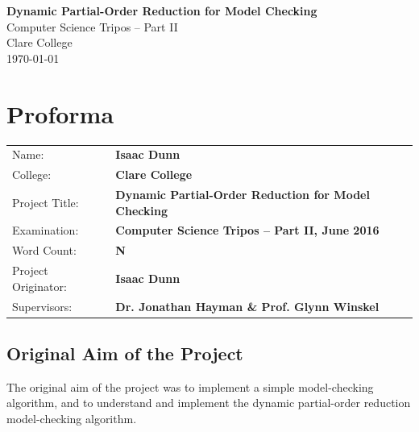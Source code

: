 \documentclass[12pt,a4paper,twoside,openright]{report}
\begin{document}





\pagestyle{empty}


\vspace*{60mm}
\begin{center}
\Huge
\textbf{Dynamic Partial-Order Reduction for Model Checking} \\[7mm]
Computer Science Tripos -- Part II \\[6mm]
Clare College \\[7mm]
\LARGE \today  %
\end{center}


\pagestyle{plain}

\chapter*{Proforma}

{\large
\begin{tabular}{ll}
Name:           & \bf Isaac Dunn                            			 \\
College:        & \bf Clare College                    				     \\
Project Title:	& \bf Dynamic Partial-Order Reduction for Model Checking \\
Examination:    & \bf Computer Science Tripos -- Part II, June 2016      \\
Word Count:     & \bf N    												 \\
Project Originator: & \bf Isaac Dunn\footnotemark[1] 					 \\
Supervisors:	& \bf Dr. Jonathan Hayman \& Prof. Glynn Winskel         \\
\end{tabular}
}


\section*{Original Aim of the Project}

The original aim of the project was to implement
a simple model-checking algorithm, and to
understand and implement the dynamic partial-order reduction
model-checking algorithm.
\end{document}
